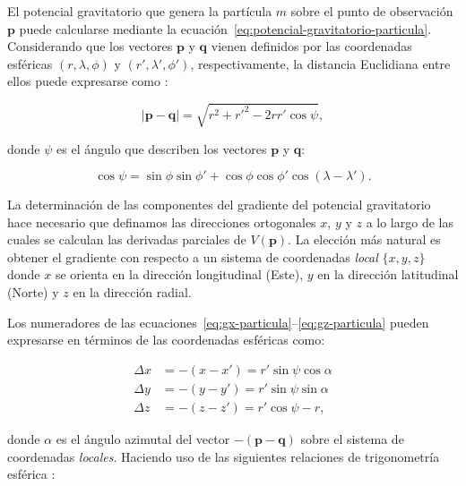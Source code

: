 El potencial gravitatorio que genera la partícula $m$ sobre el punto de
observación $\mathbf{p}$ puede calcularse mediante la
ecuación~\ref{eq:potencial-gravitatorio-particula}.
Considerando que los vectores $\mathbf{p}$ y $\mathbf{q}$ vienen definidos por
las coordenadas esféricas $(r, \lambda, \phi)$ y $(r', \lambda', \phi')$,
respectivamente, la distancia Euclidiana entre ellos puede expresarse como
\citep{grombein2013}:

\begin{equation}
    |\mathbf{p} - \mathbf{q}| = \sqrt{
        r^2 + r'^2 - 2rr'\cos\psi
    },
    \label{eq:distance-spherical}
\end{equation}

\noindent donde $\psi$ es el ángulo que describen los vectores $\mathbf{p}$
y $\mathbf{q}$:

\begin{equation}
    \cos \psi =
        \sin \phi \sin \phi' + \cos \phi \cos \phi' \cos(\lambda - \lambda').
    \label{eq:cosphi}
\end{equation}

La determinación de las componentes del gradiente del potencial gravitatorio
hace necesario que definamos las direcciones ortogonales $x$, $y$ y $z$ a lo
largo de las cuales se calculan las derivadas parciales de $V(\mathbf{p})$.
La elección más natural es obtener el gradiente con respecto a un sistema de
coordenadas \emph{local} $\{x, y, z\}$ \citep{grombein2013,uieda2016} donde $x$
se orienta en la dirección longitudinal (Este), $y$ en la dirección latitudinal
(Norte) y $z$ en la dirección radial.

Los numeradores de las ecuaciones~\ref{eq:gx-particula}--\ref{eq:gz-particula}
pueden expresarse en términos de las coordenadas esféricas como:

\begin{align}
    \Delta x &= - (x - x') = r' \sin\psi \cos\alpha
    \label{eq:delta-x-raw}
    \\
    \Delta y &= - (y - y') = r' \sin\psi \sin\alpha
    \label{eq:delta-y-raw}
    \\
    \Delta z &= - (z - z') = r'\cos\psi - r,
    \label{eq:delta-z-raw}
\end{align}

\noindent donde $\alpha$ es el ángulo azimutal del vector
$-(\mathbf{p} - \mathbf{q})$ sobre el sistema de coordenadas \emph{locales}.
Haciendo uso de las siguientes relaciones de trigonometría esférica
\citep[][p.~113]{heiskanen1967}:

